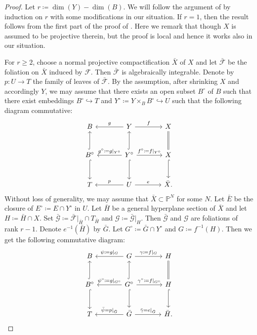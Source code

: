 \documentclass[12pt,twoside]{amsart}
\theoremstyle{definition}
\begin{document}
\begin{proof}
	Let $r\coloneqq \dim (Y)-\dim(B)$. We will follow the argument of \cite[Proposition 4.17]{Druel2021} by induction on $r$ with some modifications in our situation. If $r=1$, then the result follows from the first part of the proof of \cite[Proposition 4.17]{Druel2021}. Here we remark that though $X$ is assumed to be projective therein, but the proof is local and hence it works also in our situation.
	
	For $r\geq 2$, choose a normal projective compactification $\bar{X}$ of $X$ and let $\bar{\mathcal{F}}$ be the foliation on $\bar{X}$ induced by $\mathcal{F}$. Then $\bar{\mathcal{F}}$ is algebraically integrable. Denote by $ {p}\colon U\rightarrow T$ the family of leaves of $\bar{\mathcal{F}}$. By the assumption, after shrinking $X$ and accordingly $Y$, we may assume that there exists an open subset $B^{\circ}$ of $B$ such that there exist embeddings $B^{\circ}\hookrightarrow T$ and $Y^{\circ}\coloneqq Y\times_B  B^{\circ}\hookrightarrow U$ such that the following diagram commutative:
	\[
	\begin{tikzcd}[row sep=large,column sep=large]
		B  %
		& Y \arrow[l,"{g}" above] \arrow[r,"{f}"] 
		& X \\
		B^{\circ} \arrow[d,hookrightarrow] \arrow[u,hookrightarrow]
		 & Y^{\circ} \arrow[l,"{g^{\circ}\coloneqq g|_{Y^{\circ}}}" above] \arrow[r,"{f^{\circ}\coloneqq f|_{Y^{\circ}}}"] \arrow[u,hookrightarrow]
 \arrow[d,hookrightarrow]
		 & X \arrow[d,hookrightarrow] \arrow[u,equal] \\
		T 
		 & U \arrow[l,"{p}" above] \arrow[r,"e"]
		 & \bar{X}.
	\end{tikzcd}
	\]
	Without loss of generality, we may assume that $\bar{X}\subset \mathbb{P}^N$ for some $N$. Let $\bar{E}$ be the closure of $E^{\circ}\coloneqq E\cap Y^{\circ}$ in $U$. Let $\bar{H}$ be a general hyperplane section of $\bar{X}$ and let $H\coloneqq \bar{H}\cap X$. Set $\bar{\mathcal{G}}\coloneqq \bar{\mathcal{F}}|_{\bar{H}}\cap T_{\bar{H}}$ and $\mathcal{G}\coloneqq \bar{\mathcal{G}}|_H$. Then $\bar{\mathcal{G}}$ and $\mathcal{G}$ are foliations of rank $r-1$. Denote $e^{-1}(\bar{H})$ by $\bar{G}$. Let $G^{\circ}\coloneqq \bar{G}\cap Y^{\circ}$ and $G\coloneqq f^{-1}(H)$. Then we get the following commutative diagram:
	\[
	\begin{tikzcd}[row sep=large,column sep=large]
		B  %
		& G \arrow[l,"{\psi\coloneqq g|_G}" above] \arrow[r,"{\gamma\coloneqq f|_G}"] 
		& H \\
		B^{\circ} \arrow[d,hookrightarrow] \arrow[u,hookrightarrow]
		& G^{\circ} \arrow[l,"{\psi^{\circ}\coloneqq g|_{G^{\circ}}}" above] \arrow[r,"{\gamma^{\circ}\coloneqq f|_{G^{\circ}}}"] \arrow[u,hookrightarrow]
		\arrow[d,hookrightarrow]
		& H \arrow[d,hookrightarrow] \arrow[u,equal] \\
		T 
		& \bar{G} \arrow[l,"{\bar{\psi}=p|_{\bar{G}}}" above] \arrow[r,"{\bar{\gamma}=e|_{\bar{G}}}"]
		& \bar{H}.
	\end{tikzcd}
	\]	
	

\end{proof}
\end{document}
